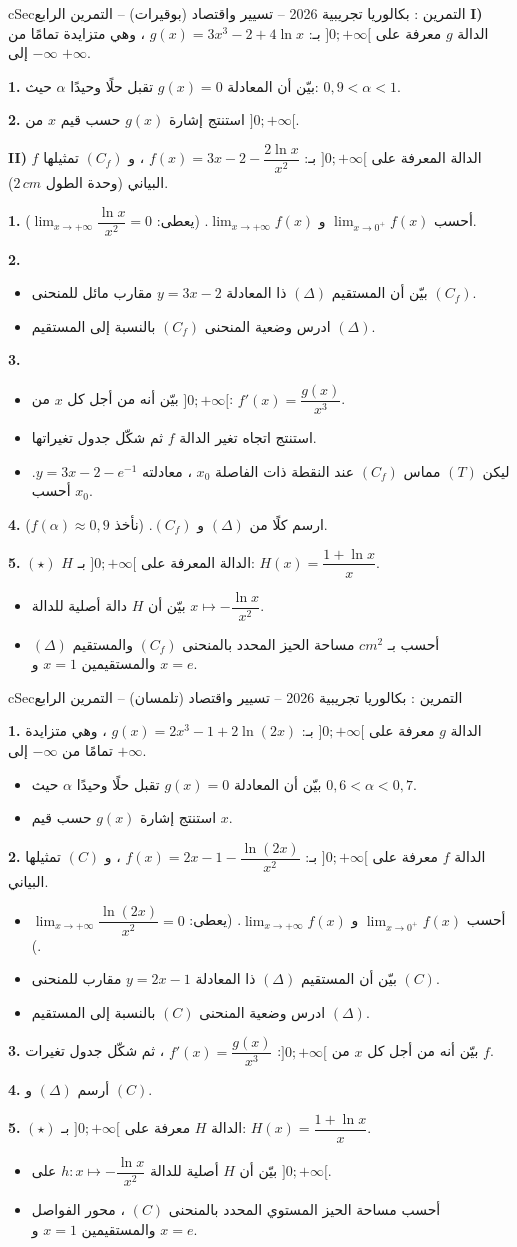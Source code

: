 \documentclass[12pt,a4paper]{article}
\newenvironment{BOX}[2]{\begin{otherlanguage}{english}\begin{arbox}{#1}{#2}}{\end{arbox}\end{otherlanguage}}
\newcounter{exo}
\newenvironment{tamrin}[1]{\stepcounter{exo}\begin{BOX}{cSec}{التمرين \theexo: #1}}{\end{BOX}}
\newenvironment{sq}{\begin{itemize}[leftmargin=2.4em,itemsep=3pt]}{\end{itemize}}
\newcommand{\qa}{\item[(أ)]}\newcommand{\qb}{\item[(ب)]}\newcommand{\qc}{\item[(جـ)]}\newcommand{\qd}{\item[(د)]}\newcommand{\qe}{\item[(هـ)]}
\newcommand{\QQ}[1]{\par\smallskip\textbf{#1.} }
\newcommand{\Lm}[1]{\displaystyle\lim_{x\to#1}}
\begin{document}
\begin{tamrin}{بكالوريا تجريبية 2026 -- تسيير واقتصاد (بوقيرات) -- التمرين الرابع}
\textbf{I)} الدالة $g$ معرفة على $]0;+\infty[$ بـ: $g(x)=3x^3-2+4\ln x$ ، وهي متزايدة تمامًا من $-\infty$ إلى $+\infty$.
\QQ{1} بيّن أن المعادلة $g(x)=0$ تقبل حلًا وحيدًا $\alpha$ حيث: $0{,}9<\alpha<1$.
\QQ{2} استنتج إشارة $g(x)$ حسب قيم $x$ من $]0;+\infty[$.\par
\textbf{II)} $f$ الدالة المعرفة على $]0;+\infty[$ بـ: $f(x)=3x-2-\dfrac{2\ln x}{x^2}$ ، و $(C_f)$ تمثيلها البياني (وحدة الطول $2\,cm$).
\QQ{1} أحسب $\Lm{0^+}f(x)$ و $\Lm{+\infty}f(x)$. (يعطى: $\Lm{+\infty}\dfrac{\ln x}{x^2}=0$).
\QQ{2}
\begin{sq}
\qa بيّن أن المستقيم $(\Delta)$ ذا المعادلة $y=3x-2$ مقارب مائل للمنحنى $(C_f)$.
\qb ادرس وضعية المنحنى $(C_f)$ بالنسبة إلى المستقيم $(\Delta)$.
\end{sq}
\QQ{3}
\begin{sq}
\qa بيّن أنه من أجل كل $x$ من $]0;+\infty[$: $f'(x)=\dfrac{g(x)}{x^3}$.
\qb استنتج اتجاه تغير الدالة $f$ ثم شكّل جدول تغيراتها.
\qc ليكن $(T)$ مماس $(C_f)$ عند النقطة ذات الفاصلة $x_0$ ، معادلته $y=3x-2-e^{-1}$. أحسب $x_0$.
\end{sq}
\QQ{4} ارسم كلًا من $(\Delta)$ و $(C_f)$. (نأخذ $f(\alpha)\approx0{,}9$).
\QQ{5} $(\star)$ $H$ الدالة المعرفة على $]0;+\infty[$ بـ: $H(x)=\dfrac{1+\ln x}{x}$.
\begin{sq}
\qa بيّن أن $H$ دالة أصلية للدالة $x\mapsto-\dfrac{\ln x}{x^2}$.
\qb أحسب بـ $cm^2$ مساحة الحيز المحدد بالمنحنى $(C_f)$ والمستقيم $(\Delta)$ والمستقيمين $x=1$ و $x=e$.
\end{sq}
\end{tamrin}

\begin{tamrin}{بكالوريا تجريبية 2026 -- تسيير واقتصاد (تلمسان) -- التمرين الرابع}
\QQ{1} الدالة $g$ معرفة على $]0;+\infty[$ بـ: $g(x)=2x^3-1+2\ln(2x)$ ، وهي متزايدة تمامًا من $-\infty$ إلى $+\infty$.
\begin{sq}
\qa بيّن أن المعادلة $g(x)=0$ تقبل حلًا وحيدًا $\alpha$ حيث $0{,}6<\alpha<0{,}7$.
\qb استنتج إشارة $g(x)$ حسب قيم $x$.
\end{sq}
\QQ{2} الدالة $f$ معرفة على $]0;+\infty[$ بـ: $f(x)=2x-1-\dfrac{\ln(2x)}{x^2}$ ، و $(C)$ تمثيلها البياني.
\begin{sq}
\qa أحسب $\Lm{0^+}f(x)$ و $\Lm{+\infty}f(x)$. (يعطى: $\Lm{+\infty}\dfrac{\ln(2x)}{x^2}=0$).
\qb بيّن أن المستقيم $(\Delta)$ ذا المعادلة $y=2x-1$ مقارب للمنحنى $(C)$.
\qc ادرس وضعية المنحنى $(C)$ بالنسبة إلى المستقيم $(\Delta)$.
\end{sq}
\QQ{3} بيّن أنه من أجل كل $x$ من $]0;+\infty[$: $f'(x)=\dfrac{g(x)}{x^3}$ ، ثم شكّل جدول تغيرات $f$.
\QQ{4} أرسم $(\Delta)$ و $(C)$.
\QQ{5} $(\star)$ الدالة $H$ معرفة على $]0;+\infty[$ بـ: $H(x)=\dfrac{1+\ln x}{x}$.
\begin{sq}
\qa بيّن أن $H$ أصلية للدالة $h:x\mapsto-\dfrac{\ln x}{x^2}$ على $]0;+\infty[$.
\qb أحسب مساحة الحيز المستوي المحدد بالمنحنى $(C)$ ، محور الفواصل والمستقيمين $x=1$ و $x=e$.
\end{sq}
\end{tamrin}
\end{document}
